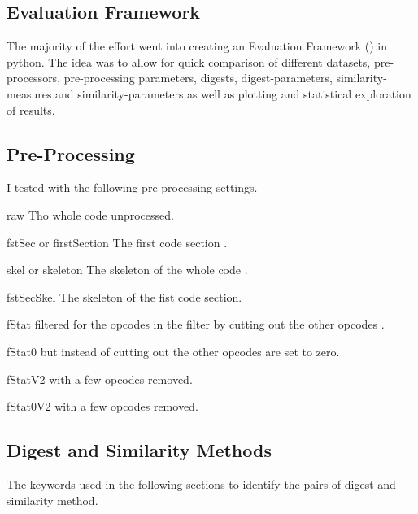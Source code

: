 \documentclass[../main.tex]{subfiles}
\begin{document}
\subsection{Evaluation Framework}
The majority of the effort went into creating an Evaluation Framework () in python.
The idea was to allow for quick comparison of different datasets, pre-processors, pre-processing parameters, digests, digest-parameters, similarity-measures and similarity-parameters as well as plotting and statistical exploration of results.

\subsection{Pre-Processing}
I tested with the following pre-processing settings.

\begin{desc}
  \item[raw] Tho whole code unprocessed.
  \item[fstSec or firstSection] The first code section .
  \item[skel or skeleton] The skeleton of the whole code .
  \item[fstSecSkel] The skeleton of the fist code section.
  \item[fStat]  filtered for the opcodes in the  filter by cutting out the other opcodes .
  \item[fStat0]  but instead of cutting out the other opcodes are set to zero.
  \item[fStatV2]  with a few opcodes removed.
  \item[fStat0V2]  with a few opcodes removed.
\end{desc}

\subsection{Digest and Similarity Methods}
The keywords used in the following sections to identify the pairs of digest and similarity method.
\end{document}
